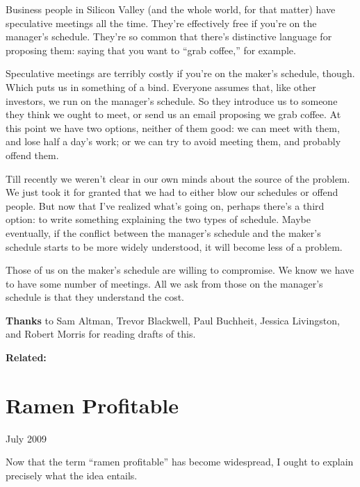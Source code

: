 \documentclass[12pt]{book}
\begin{document}
Business people in Silicon Valley (and the whole world, for that matter)
have speculative meetings all the time. They're effectively free if
you're on the manager's schedule. They're so common that there's
distinctive language for proposing them: saying that you want to ``grab
coffee,'' for example.

Speculative meetings are terribly costly if you're on the maker's
schedule, though. Which puts us in something of a bind. Everyone assumes
that, like other investors, we run on the manager's schedule. So they
introduce us to someone they think we ought to meet, or send us an email
proposing we grab coffee. At this point we have two options, neither of
them good: we can meet with them, and lose half a day's work; or we can
try to avoid meeting them, and probably offend them.

Till recently we weren't clear in our own minds about the source of the
problem. We just took it for granted that we had to either blow our
schedules or offend people. But now that I've realized what's going on,
perhaps there's a third option: to write something explaining the two
types of schedule. Maybe eventually, if the conflict between the
manager's schedule and the maker's schedule starts to be more widely
understood, it will become less of a problem.

Those of us on the maker's schedule are willing to compromise. We know
we have to have some number of meetings. All we ask from those on the
manager's schedule is that they understand the cost.

\textbf{Thanks} to Sam Altman, Trevor Blackwell, Paul Buchheit, Jessica
Livingston, and Robert Morris for reading drafts of this.

\textbf{Related:}
\chapter{Ramen Profitable}

July 2009

Now that the term ``ramen profitable'' has become widespread, I ought to
explain precisely what the idea entails.
\end{document}
